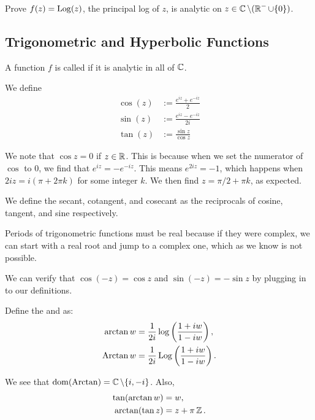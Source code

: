 \begin{exercise}
    Prove $f(z) = {\operatorname{Log}}(z)$, the principal log of $z$, is analytic on $z \in \operatorname{\mathbb{C}} \setminus (\operatorname{\mathbb{R}}^- \cup \{0\})$.
\end{exercise}

\subsection{Trigonometric and Hyperbolic Functions}

\begin{definition}
    A function $f$ is called  if it is analytic in all of $\operatorname{\mathbb{C}}$.
\end{definition}

We define
\begin{align*}
    \cos (z) &:= \frac{e^{iz} + e^{-iz}}{2} \\
    \sin (z) &:= \frac{e^{iz} - e^{-iz}}{2i} \\
    \tan (z) &:= \frac{\sin z}{\cos z}
\end{align*}


\noindent 
We note that $\cos z = 0$ if $z \in \operatorname{\mathbb{R}}$.  This is because when we set the numerator of $\cos$ to $0$, we find
that $e^{iz} = -e^{-iz}$. 
This means $e^{2iz} = -1$, which happens when $2iz = i(\pi + 2\pi k)$ for some integer $k$.
We then find $z = \pi/2 + \pi k$, as expected.


\noindent
We define the secant, cotangent, and cosecant as the reciprocals of cosine, tangent, and sine respectively.

\noindent
Periods of trigonometric functions must be real because if they were complex, we can start with a real root and jump to a complex one, which as we know is not possible.

\noindent
We can verify that $\cos (-z) = \cos z$ and $\sin (-z) = -\sin z$ by plugging in to our definitions.

\begin{definition}
    Define the  and 
     as:
    \begin{align*}
        \arctan w &= \frac{1}{2i} \log \left( \frac{1 + iw}{1 - iw}\right), \\
        \operatorname{Arctan} w &= \frac{1}{2i} \operatorname{Log} \left( \frac{1 + iw}{1 - iw}\right).
    \end{align*}
\end{definition}
We see that $\operatorname{dom} (\operatorname{Arctan}) = \operatorname{\mathbb{C}} \setminus \{i, -i\}$.
Also,
\begin{align*}
    \tan( \arctan w ) &= w, \\
    \arctan( \tan z ) &= z + \pi \operatorname{\mathbb{Z}}.
\end{align*}

